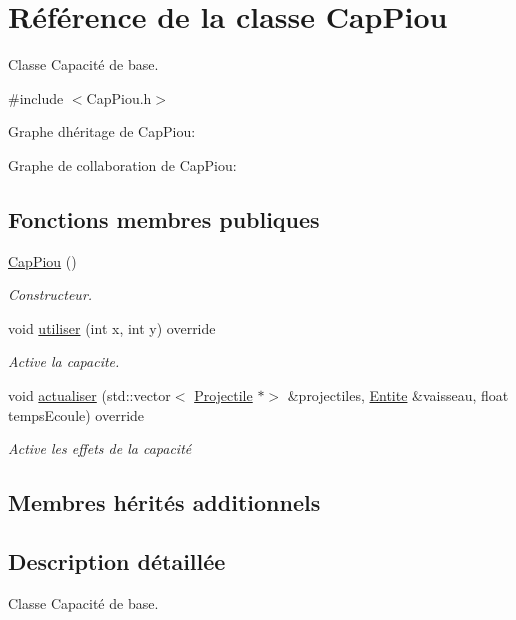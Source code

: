 \hypertarget{class_cap_piou}{}\section{Référence de la classe Cap\+Piou}
\label{class_cap_piou}


Classe Capacité de base.  




{\ttfamily \#include $<$Cap\+Piou.\+h$>$}



Graphe d\textquotesingle{}héritage de Cap\+Piou\+:


Graphe de collaboration de Cap\+Piou\+:
\subsection*{Fonctions membres publiques}
\begin{DoxyCompactItemize}
\item 
\hyperlink{class_cap_piou_aa2ed61fb1313a447cf8444399001750d}{Cap\+Piou} ()
\begin{DoxyCompactList}\small\item\em Constructeur. \end{DoxyCompactList}\item 
void \hyperlink{class_cap_piou_aad0eb3b9fab67785e1d0441b96aa921f}{utiliser} (int x, int y) override
\begin{DoxyCompactList}\small\item\em Active la capacite. \end{DoxyCompactList}\item 
void \hyperlink{class_cap_piou_a0823f301d48377ca2e14a0cd17922716}{actualiser} (std\+::vector$<$ \hyperlink{class_projectile}{Projectile} $\ast$$>$ \&projectiles, \hyperlink{class_entite}{Entite} \&vaisseau, float temps\+Ecoule) override
\begin{DoxyCompactList}\small\item\em Active les effets de la capacité \end{DoxyCompactList}\end{DoxyCompactItemize}
\subsection*{Membres hérités additionnels}


\subsection{Description détaillée}
Classe Capacité de base. 

